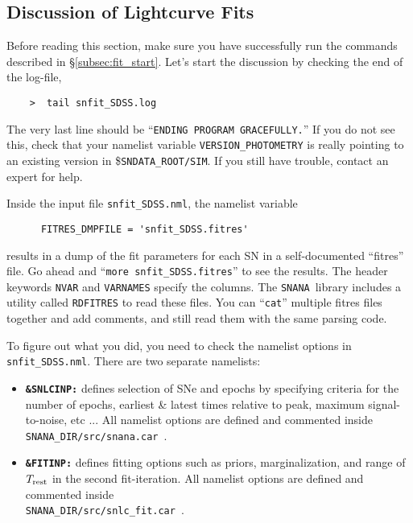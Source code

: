 \documentclass[12pt]{article}
\newcommand{\snana}{{\tt SNANA}}
\newcommand{\snanadir}{{\tt SNANA\_DIR}}
\newcommand{\sndataroot}{{\tt SNDATA\_ROOT}}
\begin{document}
   \subsection{Discussion of Lightcurve Fits}
   \label{subsec:fit_discuss}

Before reading this section, make sure you have successfully
run the commands described in \S\ref{subsec:fit_start}.
Let's start the discussion by checking the end of the log-file,
\begin{verbatim}
    >  tail snfit_SDSS.log
\end{verbatim}
%
The very last line should be ``{\tt ENDING PROGRAM GRACEFULLY.}''
If you do not see this, check that your namelist variable
{\tt VERSION\_PHOTOMETRY} is really pointing to an existing
version in \$\sndataroot{\tt /SIM}.
If you still have trouble, contact an expert for help.

Inside the input file {\tt snfit\_SDSS.nml},
the namelist variable
\begin{verbatim}
      FITRES_DMPFILE = 'snfit_SDSS.fitres'
\end{verbatim}
%
results in a dump of the fit parameters for each SN in 
a self-documented ``fitres'' file. Go ahead and
``{\tt more snfit\_SDSS.fitres}'' to see the results.
The header keywords {\tt NVAR} and {\tt VARNAMES} specify
the columns.  The \snana\ library includes a utility
called {\tt RDFITRES} to read these files.
You can ``{\tt cat}'' multiple fitres files together
and add comments,
and still read them with the same parsing code.


To figure out what you did, you need to 
check the namelist options in {\tt snfit\_SDSS.nml}.
There are two separate namelists:
\begin{itemize}
 \item	{\bf \tt \&SNLCINP:} defines selection of SNe and epochs
   	by specifying criteria for the number of epochs, 
	earliest \& latest times relative  to peak, 
	maximum signal-to-noise, etc ... 
   	All namelist options are defined and commented inside
  	\snanadir{\tt /src/snana.car}~.
%
 \item	{\bf \tt \&FITINP:} defines fitting options such as priors,
     	marginalization, and range of $T_{\rm rest}$ in the second
	fit-iteration.
     	All namelist options are defined and commented inside \\
     	\snanadir{\tt /src/snlc\_fit.car}~. 
\end{itemize}
\end{document}
